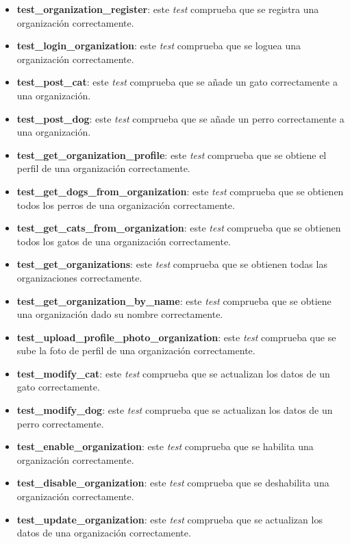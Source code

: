 \begin{itemize}
    \item \textbf{test\_organization\_register}: este \textit{test} comprueba que se registra una organización correctamente.
    \item \textbf{test\_login\_organization}: este \textit{test} comprueba que se loguea una organización correctamente.
    \item \textbf{test\_post\_cat}: este \textit{test} comprueba que se añade un gato correctamente a una organización.
    \item \textbf{test\_post\_dog}: este \textit{test} comprueba que se añade un perro correctamente a una organización.
    \item \textbf{test\_get\_organization\_profile}: este \textit{test} comprueba que se obtiene el perfil de una organización correctamente.
    \item \textbf{test\_get\_dogs\_from\_organization}: este \textit{test} comprueba que se obtienen todos los perros de una organización correctamente.
    \item \textbf{test\_get\_cats\_from\_organization}: este \textit{test} comprueba que se obtienen todos los gatos de una organización correctamente.
    \item \textbf{test\_get\_organizations}: este \textit{test} comprueba que se obtienen todas las organizaciones correctamente.
    \item \textbf{test\_get\_organization\_by\_name}: este \textit{test} comprueba que se obtiene una organización dado su nombre correctamente.
    \item \textbf{test\_upload\_profile\_photo\_organization}: este \textit{test} comprueba que se sube la foto de perfil de una organización correctamente.
    \item \textbf{test\_modify\_cat}: este \textit{test} comprueba que se actualizan los datos de un gato correctamente.
    \item \textbf{test\_modify\_dog}: este \textit{test} comprueba que se actualizan los datos de un perro correctamente.
    \item \textbf{test\_enable\_organization}: este \textit{test} comprueba que se habilita una organización correctamente.
    \item \textbf{test\_disable\_organization}: este \textit{test} comprueba que se deshabilita una organización correctamente.
    \item \textbf{test\_update\_organization}: este \textit{test} comprueba que se actualizan los datos de una organización correctamente.
\end{itemize}

